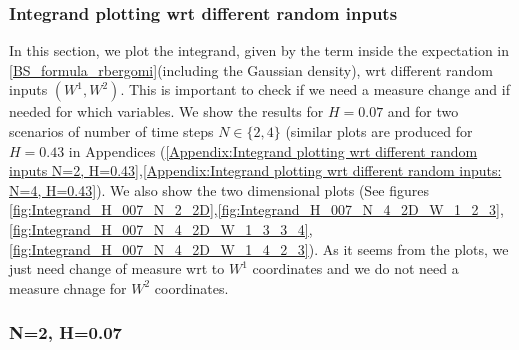 \documentclass[11pt]{article}
\begin{document}
\subsubsection{Integrand plotting wrt different random inputs } \label{sec:Integrand plotting wrt different random inputs}
In this section, we plot the integrand, given by the term inside the expectation in \eqref{BS_formula_rbergomi}(including the Gaussian density), wrt different random inputs $(W^1,W^2)$. This is important to check if we need a measure change and if needed for which variables. We show the results for  $H=0.07$ and for two scenarios of number of time steps $N \in \{2,4\}$ (similar plots are produced for $H=0.43$ in Appendices (\ref{Appendix:Integrand plotting wrt different random inputs N=2, H=0.43},\ref{Appendix:Integrand plotting wrt different random inputs: N=4, H=0.43}). We also show the two dimensional plots (See figures \ref{fig:Integrand_H_007_N_2_2D},\ref{fig:Integrand_H_007_N_4_2D_W_1_2_3},\ref{fig:Integrand_H_007_N_4_2D_W_1_3_3_4},\ref{fig:Integrand_H_007_N_4_2D_W_1_4_2_3}). As it seems from the plots, we  just need change of measure wrt to $W^1$ coordinates and we do not need a measure chnage for $W^2$ coordinates. 



\subsubsection*{N=2, H=0.07}
\end{document}
